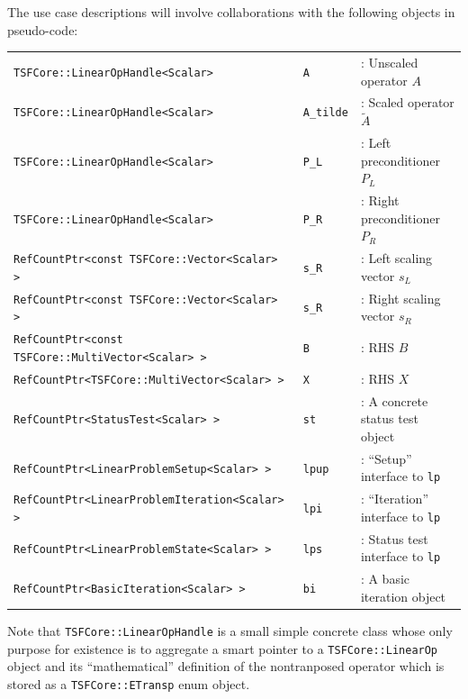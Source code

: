 \documentclass[pdf,ps2pdf,11pt]{SANDreport}
\begin{document}
The use case descriptions will involve collaborations with the
following objects in pseudo-code:

\begin{tabular}{lll}
{\small\texttt{TSFCore::LinearOpHandle<Scalar>}} & {\small\texttt{A}} & : Unscaled operator $A$ \\
{\small\texttt{TSFCore::LinearOpHandle<Scalar>}} & {\small\texttt{A\_tilde}} & : Scaled operator $\tilde{A}$ \\
{\small\texttt{TSFCore::LinearOpHandle<Scalar>}} & {\small\texttt{P\_L}} & : Left preconditioner $P_L$ \\
{\small\texttt{TSFCore::LinearOpHandle<Scalar>}} & {\small\texttt{P\_R}} & : Right preconditioner $P_R$ \\
{\small\texttt{RefCountPtr<const TSFCore::Vector<Scalar> >}} & {\small\texttt{s\_R}} & : Left scaling vector $s_L$ \\
{\small\texttt{RefCountPtr<const TSFCore::Vector<Scalar> >}} & {\small\texttt{s\_R}} & : Right scaling vector $s_R$ \\
{\small\texttt{RefCountPtr<const TSFCore::MultiVector<Scalar> >}} & {\small\texttt{B}} & : RHS $B$ \\
{\small\texttt{RefCountPtr<TSFCore::MultiVector<Scalar> >}} & {\small\texttt{X}} & : RHS $X$ \\
{\small\texttt{RefCountPtr<StatusTest<Scalar> >}} & {\small\texttt{st}} & : A concrete status test object  \\
{\small\texttt{RefCountPtr<LinearProblemSetup<Scalar> >}} & {\small\texttt{lpup}} & : ``Setup'' interface to {}\texttt{lp} \\
{\small\texttt{RefCountPtr<LinearProblemIteration<Scalar> >}} & {\small\texttt{lpi}} & : ``Iteration'' interface to  {}\texttt{lp} \\
{\small\texttt{RefCountPtr<LinearProblemState<Scalar> >}} & {\small\texttt{lps}} & : Status test interface to  {}\texttt{lp} \\
{\small\texttt{RefCountPtr<BasicIteration<Scalar> >}} & {\small\texttt{bi}} & : A basic iteration object
\end{tabular}

Note that {}\texttt{TSFCore::\-Linear\-Op\-Handle} is a small simple
concrete class whose only purpose for existence is to aggregate a
smart pointer to a {}\texttt{TSFCore::\-Linear\-Op} object and its
``mathematical'' definition of the nontranposed operator which is
stored as a {}\texttt{TSFCore::\-ETransp} enum object.
\end{document}
